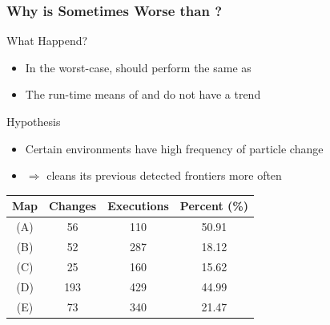 \begin{frame}
\frametitle{Why is \WFDINC Sometimes Worse than \WFD?}

\begin{alertblock}{What Happend?}
	\begin{itemize}
	  \item In the worst-case, \WFDINC should perform the same as \WFD
	  \item The run-time means of \WFD and \WFDINC do not have a trend
	\end{itemize}
\end{alertblock}
\pause
\begin{exampleblock}{Hypothesis}
	\begin{itemize}
	  \item Certain environments have high frequency of particle
	  change
	  \item $\Rightarrow$ \WFDINC cleans its previous detected frontiers more often
	  
	\end{itemize}
\end{exampleblock}

\begin{table}
\centering
\begin{tabular}{|c|c|c||c|}
\hline \textbf{Map}&\textbf{Changes}&\textbf{Executions}&\textbf{Percent (\%)}
\\
\hline 
\hline (A)& 56 & 110 & 50.91  \\
\hline (B)& 52 & 287 & 18.12  \\
\hline (C)& 25 & 160 & 15.62  \\
\hline (D)& 193 & 429 & 44.99 \\ 
\hline (E)& 73 & 340 & 21.47 \\ \hline
\end{tabular}
\end{table}

\end{frame}

